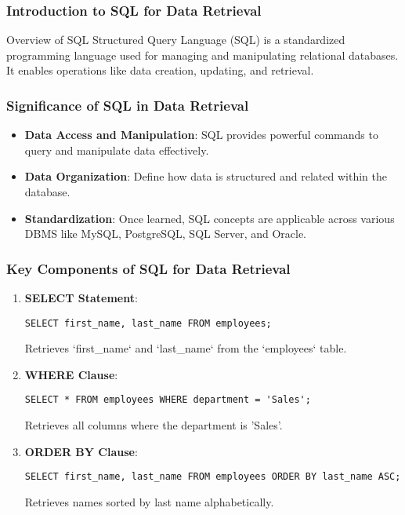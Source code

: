 \documentclass[aspectratio=169]{beamer}
\begin{document}
\frame{\titlepage}

\begin{frame}[fragile]
    \frametitle{Introduction to SQL for Data Retrieval}
    \begin{block}{Overview of SQL}
        Structured Query Language (SQL) is a standardized programming language used for managing and manipulating relational databases. It enables operations like data creation, updating, and retrieval.
    \end{block}
\end{frame}

\begin{frame}[fragile]
    \frametitle{Significance of SQL in Data Retrieval}
    \begin{itemize}
        \item \textbf{Data Access and Manipulation}: SQL provides powerful commands to query and manipulate data effectively.
        \item \textbf{Data Organization}: Define how data is structured and related within the database.
        \item \textbf{Standardization}: Once learned, SQL concepts are applicable across various DBMS like MySQL, PostgreSQL, SQL Server, and Oracle.
    \end{itemize}
\end{frame}

\begin{frame}[fragile]
    \frametitle{Key Components of SQL for Data Retrieval}
    \begin{enumerate}
        \item \textbf{SELECT Statement}:
            \begin{lstlisting}
SELECT first_name, last_name FROM employees;
            \end{lstlisting}
            Retrieves `first_name` and `last_name` from the `employees` table.

        \item \textbf{WHERE Clause}:
            \begin{lstlisting}
SELECT * FROM employees WHERE department = 'Sales';
            \end{lstlisting}
            Retrieves all columns where the department is 'Sales'.

        \item \textbf{ORDER BY Clause}:
            \begin{lstlisting}
SELECT first_name, last_name FROM employees ORDER BY last_name ASC;
            \end{lstlisting}
            Retrieves names sorted by last name alphabetically.
    \end{enumerate}
\end{frame}
\end{document}
